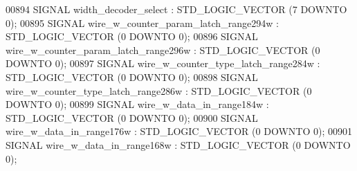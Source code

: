 \begin{DoxyCode}
{00894      \textcolor{keywordflow}{SIGNAL}  \textcolor{vhdlchar}{width_decoder_select} \textcolor{vhdlchar}{:} \textcolor{comment}{STD\_LOGIC\_VECTOR} \textcolor{vhdlchar}{(}\textcolor{vhdllogic}{}\textcolor{vhdllogic}{7} \textcolor{keywordflow}{DOWNTO} \textcolor{vhdllogic}{}\textcolor{vhdllogic}{0}\textcolor{vhdlchar}{)};
00895      \textcolor{keywordflow}{SIGNAL}  \textcolor{vhdlchar}{wire_w_counter_param_latch_range294w}   \textcolor{vhdlchar}{:}   \textcolor{comment}{STD\_LOGIC\_VECTOR} \textcolor{vhdlchar}{(}\textcolor{vhdllogic}{}\textcolor{vhdllogic}{0} \textcolor{keywordflow}{DOWNTO} \textcolor{vhdllogic}{}\textcolor{vhdllogic}{0}\textcolor{vhdlchar}{)};
00896      \textcolor{keywordflow}{SIGNAL}  \textcolor{vhdlchar}{wire_w_counter_param_latch_range296w}   \textcolor{vhdlchar}{:}   \textcolor{comment}{STD\_LOGIC\_VECTOR} \textcolor{vhdlchar}{(}\textcolor{vhdllogic}{}\textcolor{vhdllogic}{0} \textcolor{keywordflow}{DOWNTO} \textcolor{vhdllogic}{}\textcolor{vhdllogic}{0}\textcolor{vhdlchar}{)};
00897      \textcolor{keywordflow}{SIGNAL}  \textcolor{vhdlchar}{wire_w_counter_type_latch_range284w}    \textcolor{vhdlchar}{:}   \textcolor{comment}{STD\_LOGIC\_VECTOR} \textcolor{vhdlchar}{(}\textcolor{vhdllogic}{}\textcolor{vhdllogic}{0} \textcolor{keywordflow}{DOWNTO} \textcolor{vhdllogic}{}\textcolor{vhdllogic}{0}\textcolor{vhdlchar}{)};
00898      \textcolor{keywordflow}{SIGNAL}  \textcolor{vhdlchar}{wire_w_counter_type_latch_range286w}    \textcolor{vhdlchar}{:}   \textcolor{comment}{STD\_LOGIC\_VECTOR} \textcolor{vhdlchar}{(}\textcolor{vhdllogic}{}\textcolor{vhdllogic}{0} \textcolor{keywordflow}{DOWNTO} \textcolor{vhdllogic}{}\textcolor{vhdllogic}{0}\textcolor{vhdlchar}{)};
00899      \textcolor{keywordflow}{SIGNAL}  \textcolor{vhdlchar}{wire_w_data_in_range184w}   \textcolor{vhdlchar}{:}   \textcolor{comment}{STD\_LOGIC\_VECTOR} \textcolor{vhdlchar}{(}\textcolor{vhdllogic}{}\textcolor{vhdllogic}{0} \textcolor{keywordflow}{DOWNTO} \textcolor{vhdllogic}{}\textcolor{vhdllogic}{0}\textcolor{vhdlchar}{)};
00900      \textcolor{keywordflow}{SIGNAL}  \textcolor{vhdlchar}{wire_w_data_in_range176w}   \textcolor{vhdlchar}{:}   \textcolor{comment}{STD\_LOGIC\_VECTOR} \textcolor{vhdlchar}{(}\textcolor{vhdllogic}{}\textcolor{vhdllogic}{0} \textcolor{keywordflow}{DOWNTO} \textcolor{vhdllogic}{}\textcolor{vhdllogic}{0}\textcolor{vhdlchar}{)};
00901      \textcolor{keywordflow}{SIGNAL}  \textcolor{vhdlchar}{wire_w_data_in_range168w}   \textcolor{vhdlchar}{:}   \textcolor{comment}{STD\_LOGIC\_VECTOR} \textcolor{vhdlchar}{(}\textcolor{vhdllogic}{}\textcolor{vhdllogic}{0} \textcolor{keywordflow}{DOWNTO} \textcolor{vhdllogic}{}\textcolor{vhdllogic}{0}\textcolor{vhdlchar}{)};
}
\end{DoxyCode}
